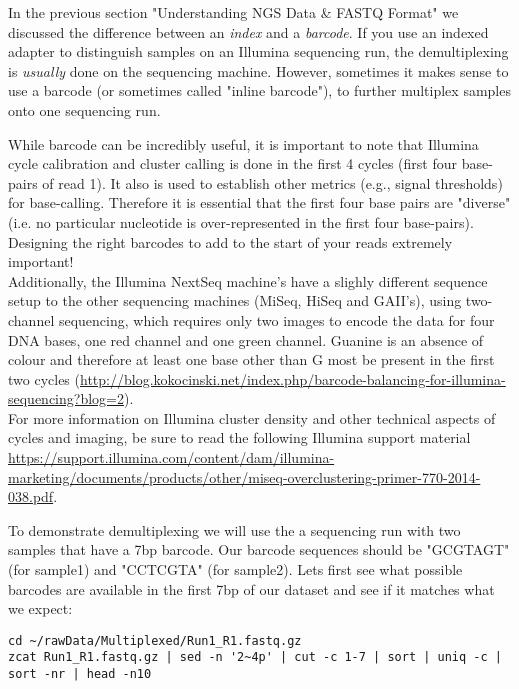 In the previous section "Understanding NGS Data \& FASTQ Format" we discussed the difference between an \textit{index} and a \textit{barcode}. If you use an indexed adapter to distinguish samples on an Illumina sequencing run, the demultiplexing is \textit{usually} done on the sequencing machine. However, sometimes it makes sense to use a barcode (or sometimes called "inline barcode"), to further multiplex samples onto one sequencing run.\\

\begin{note}
While barcode can be incredibly useful, it is important to note that Illumina cycle calibration and cluster calling is done in the first 4 cycles (first four base-pairs of read 1). It also is used to establish other metrics (e.g., signal thresholds) for base-calling.
Therefore it is essential that the first four base pairs are "diverse" (i.e. no particular nucleotide is over-represented in the first four base-pairs). Designing the right barcodes to add to the start of your reads extremely important! \\
Additionally, the Illumina NextSeq machine's have a slighly different sequence setup to the other sequencing machines (MiSeq, HiSeq and GAII's), using two-channel sequencing, which requires only two images to encode the data for four DNA bases, one red channel and one green channel. Guanine is an absence of colour and therefore at least one base other than G most be present in the first two cycles (\url{http://blog.kokocinski.net/index.php/barcode-balancing-for-illumina-sequencing?blog=2}). \\
For more information on Illumina cluster density and other technical aspects of cycles and imaging, be sure to read the following Illumina support material \url{https://support.illumina.com/content/dam/illumina-marketing/documents/products/other/miseq-overclustering-primer-770-2014-038.pdf}.
\end{note}

\begin{steps}
To demonstrate demultiplexing we will use the a sequencing run with two samples that have a 7bp barcode. Our barcode sequences should be "GCGTAGT" (for sample1) and "CCTCGTA" (for sample2). Lets first see what possible barcodes are available in the first 7bp of our dataset and see if it matches what we expect:
\begin{lstlisting}
cd ~/rawData/Multiplexed/Run1_R1.fastq.gz
zcat Run1_R1.fastq.gz | sed -n '2~4p' | cut -c 1-7 | sort | uniq -c | sort -nr | head -n10
\end{lstlisting}
\end{steps}

